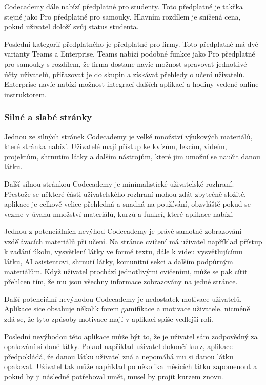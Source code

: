 Codecademy dále nabízí předplatné pro studenty. Toto předplatné je takřka stejné jako Pro předplatné pro samouky. Hlavním rozdílem je snížená cena, pokud uživatel doloží svůj status studenta.  

Poslední kategorií předplatného je předplatné pro firmy. Toto předplatné má dvě varianty Teams a Enterprise. Teams nabízí podobné funkce jako Pro předplatné pro samouky s rozdílem, že firma dostane navíc možnost spravovat jednotlivé účty uživatelů, přiřazovat je do skupin a získávat přehledy o učení uživatelů. Enterprise navíc nabízí možnost integrací dalších aplikací a hodiny vedené online instruktorem.

\subsubsection{Silné a slabé stránky}

Jednou ze silných stránek Codecademy je velké množství výukových materiálů, které stránka nabízí. Uživatelé mají přístup ke kvízům, lekcím, videím, projektům, shrnutím látky a dalším nástrojům, které jim umožní se naučit danou látku.

Další silnou stránkou Codecademy je minimalistické uživatelské rozhraní. Přestože se některé části uživatelského rozhraní mohou zdát zbytečně složité, aplikace je celkově velice přehledná a snadná na používání, obzvláště pokud se vezme v úvahu množství materiálů, kurzů a funkcí, které aplikace nabízí.

Jednou z potenciálních nevýhod Codecademy je právě samotné zobrazování vzdělávacích materiálů při učení. Na stránce cvičení má uživatel například přístup k zadání úkolu, vysvětlení látky ve formě textu, dále k videu vysvětlujícímu látku, AI asistentovi, shrnutí látky, komunitní sekci a dalším podpůrným materiálům. Když uživatel prochází jednotlivými cvičeními, může se pak cítit přehlcen tím, že mu jsou všechny informace zobrazovány na jedné stránce.

Další potenciální nevýhodou Codecademy je nedostatek motivace uživatelů. Aplikace sice obsahuje několik forem gamifikace a motivace uživatele, nicméně zdá se, že tyto způsoby motivace mají v aplikaci spíše vedlejší roli.

Poslední nevýhodou této aplikace může být to, že je uživatel sám zodpovědný za opakování si dané látky. Pokud například uživatel dokončí kurz, aplikace předpokládá, že danou látku uživatel zná a nepomáhá mu si danou látku opakovat. Uživatel tak může například po několika měsících látku zapomenout a pokud by ji následně potřeboval umět, musel by projít kurzem znovu.

